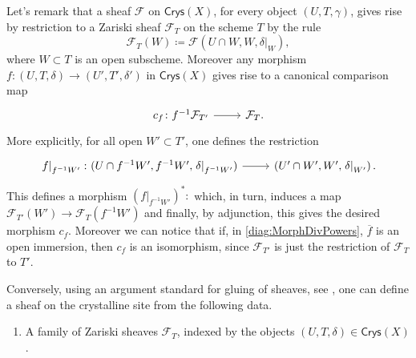 \documentclass[../Main]{subfiles}
\begin{document}
\begin{rem}\label{rem:SheavesCrysX}
	Let's remark that a sheaf $\mathcal{F}$ on $\mathsf{Crys}(X)$, for every
	object $\left(U, T, \gamma\right)$, gives rise by restriction
	to a Zariski sheaf $\mathcal{F}_T$ on the scheme $T$ by the rule
	\begin{equation*}
	\mathcal{F}_T(W) \coloneqq
	\mathcal{F}(U \cap W, W, \left.\delta\right|_{W})
	,\end{equation*}
	where $W \subset T$ is an open subscheme.
	Moreover any morphism 
	$f\colon \left(U, T, \delta\right) \to \left(U', T', \delta'\right)$
	in $\mathsf{Crys}(X)$
	gives rise to a canonical comparison map
	\begin{equation*}
	\begin{tikzcd}[row sep = 0ex
		,/tikz/column 1/.append style={anchor=base east}
		,/tikz/column 2/.append style={anchor=base west}]
		c_f\colon f^{-1}\mathcal{F}_{T'} \arrow[r, "", rightarrow] &
		\mathcal{F}_T
	.\end{tikzcd}
	\end{equation*} 
	More explicitly, for all open $W' \subset T'$, one defines the restriction
	\begin{equation*}
	\begin{tikzcd}[row sep = 0ex
		,/tikz/column 1/.append style={anchor=base east}
		,/tikz/column 2/.append style={anchor=base west}]
		\left.f\right|_{f^{-1}W'}\colon 
		(U \cap f^{-1}W', f^{-1}W', \left.\delta\right|_{f^{-1}W'} )
		\arrow[r, "", rightarrow] &
		\left(U' \cap W', W', \left.\delta\right|_{W'} \right)
	.\end{tikzcd}
	\end{equation*} 
	This defines a morphism $(\left.f\right|_{f^{-1}W'})^*\colon$
	which, in turn, induces a map $\mathcal{F}_{T'}(W') \to \mathcal{F}_T(f^{-1}W')$
	and finally, by adjunction, this gives the desired morphism $c_f$.
	Moreover we can notice that if, in \cref{diag:MorphDivPowers},
	$\overline{f}$ is an open immersion, then
	$c_f$ is an isomorphism, since $\mathcal{F}_{T'}$ is just the restriction
	of $\mathcal{F}_T$ to $T'$.

	Conversely, using an argument standard for gluing of sheaves, see 
	\cite[\href{https://stacks.math.columbia.edu/tag/07IN}{Section 07IN}]{SP},
	one can define a sheaf on the crystalline site from the following data.
	\begin{enumerate}
		\item A family of Zariski sheaves $\mathcal{F}_T$, indexed by 
			the objects $\left(U, T, \delta\right) \in \mathsf{Crys}(X)$.


\end{enumerate}
\end{rem}
\end{document}
